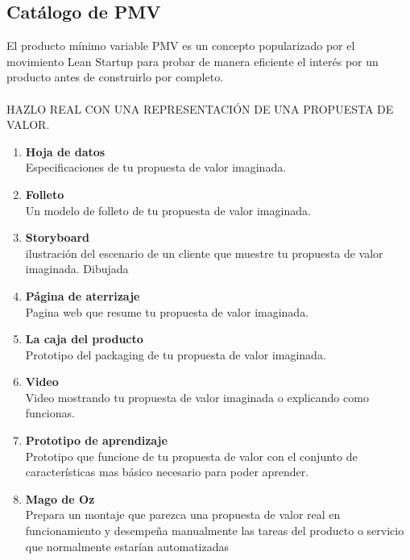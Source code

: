 \documentclass[11pt]{book}
\begin{document}
\subsection{Catálogo de PMV}
El producto mínimo variable PMV es un concepto popularizado por el movimiento Lean Startup para probar de manera eficiente el interés por un producto antes de construirlo por completo. \\\\
HAZLO REAL CON UNA REPRESENTACIÓN DE UNA PROPUESTA DE VALOR.
\begin{enumerate}
\item \textbf{ Hoja de datos  }\\
Especificaciones de tu propuesta de valor imaginada.
\item \textbf{ Folleto }\\
Un modelo de folleto de tu propuesta de valor imaginada.
\item \textbf{ Storyboard }\\
ilustración del escenario de un cliente que muestre tu propuesta de valor imaginada. Dibujada 
\item \textbf{ Página de aterrizaje }\\
Pagina web que resume tu propuesta de valor imaginada. 
\item \textbf{ La caja del producto }\\
Prototipo del packaging de tu propuesta de valor imaginada. 
\item \textbf{  Video }\\
Video mostrando tu propuesta de valor imaginada o explicando como funcionas. 
\item \textbf{ Prototipo de aprendizaje }\\
Prototipo que funcione de tu propuesta de valor con el conjunto de características mas básico necesario para poder aprender.
\item \textbf{ Mago de Oz }\\
Prepara un montaje que parezca una propuesta de valor real en funcionamiento y desempeña manualmente las tareas del producto o servicio que normalmente estarían automatizadas
\end{enumerate}
\end{document}
